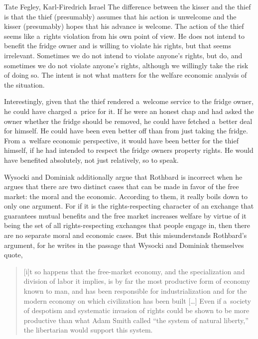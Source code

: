 \begin{artengenv2auth}{Tate Fegley, Karl-Firedrich Israel}
The difference between the kisser and the thief is that the thief (presumably) assumes that his action is unwelcome and the kisser (presumably) hopes that his advance is welcome. The action of the thief seems like a~rights violation from his own point of view. He does not intend to benefit the fridge owner and is willing to violate his rights, but that seems irrelevant. Sometimes we do not intend to violate anyone's rights, but do, and sometimes we do not violate anyone's rights, although we willingly take the risk of doing so. The intent is not what matters for the welfare economic analysis of the situation.



Interestingly, given that the thief rendered a~welcome service to the fridge owner, he could have charged a~price for it. If he were an honest chap and had asked the owner whether the fridge should be removed, he could have fetched a~better deal for himself. He could have been even better off than from just taking the fridge. From a~welfare economic perspective, it would have been better for the thief himself, if he had intended to respect the fridge owners property rights. He would have benefited absolutely, not just relatively, so to speak.



Wysocki and Dominiak additionally argue that Rothbard is incorrect when he argues that there are two distinct cases that can be made in favor of the free market: the moral and the economic. According to them, it really boils down to only one argument. For if it is the rights-respecting character of an exchange that guarantees mutual benefits and the free market increases welfare by virtue of it being the set of all rights-respecting exchanges that people engage in, then there are no separate moral and economic cases. But this misunderstands Rothbard's argument, for he writes in the passage that Wysocki and Dominiak themselves quote,



\begin{quote}
[i]t so happens that the free-market economy, and the specialization and division of labor it implies, is by far the most productive form of economy known to man, and has been responsible for industrialization and for the modern economy on which civilization has been built […] Even if a~society of despotism and systematic invasion of rights could be shown to be more productive than what Adam Smith called ``the system of natural liberty,'' the libertarian would support this system. 
\parencite[][p.48]{rothbard_for_2006}%
\end{quote}


\end{artengenv2auth}
